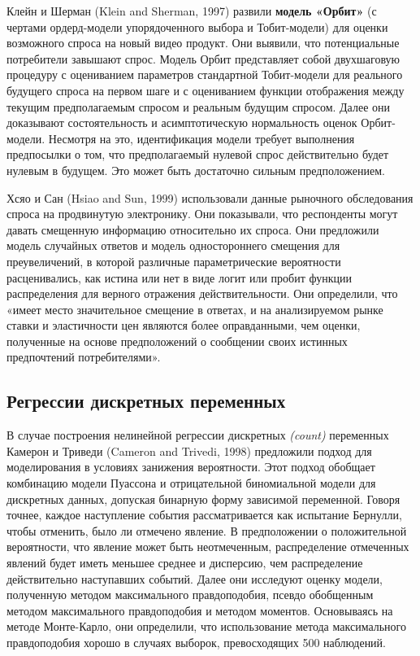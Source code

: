 Клейн и Шерман (Klein and Sherman, 1997) развили {\bf модель «Орбит»} (с чертами ордерд-модели упорядоченного выбора и Тобит-модели) для оценки возможного спроса на новый видео продукт. Они выявили, что потенциальные потребители завышают спрос. Модель Орбит представляет собой двухшаговую процедуру с оцениванием параметров стандартной Тобит-модели для реального будущего спроса на первом шаге и с оцениванием функции отображения между текущим предполагаемым спросом и реальным будущим спросом. Далее они доказывают состоятельность и асимптотическую нормальность оценок Орбит-модели. Несмотря на это, идентификация модели требует выполнения предпосылки о том, что предполагаемый нулевой спрос действительно будет нулевым в будущем. Это может быть достаточно сильным предположением.
 
Хсяо и Сан (Hsiao and Sun, 1999) использовали данные рыночного обследования спроса на продвинутую электронику. Они показывали, что респонденты могут давать смещенную информацию относительно их спроса. Они предложили модель случайных ответов и модель одностороннего смещения для преувеличений, в которой различные параметрические вероятности расценивались, как истина или нет в виде логит или пробит функции распределения для верного отражения действительности. Они определили, что «имеет место значительное смещение в ответах, и на анализируемом рынке ставки и эластичности цен являются более оправданными, чем оценки, полученные на основе  предположений о сообщении своих истинных предпочтений потребителями».

\subsection*{Регрессии дискретных переменных} 
В случае построения нелинейной регрессии дискретных \emph{(count)} переменных Камерон и Триведи (Cameron and Trivedi, 1998) предложили подход для моделирования в условиях занижения вероятности. Этот подход обобщает комбинацию модели Пуассона и отрицательной биномиальной модели для дискретных данных, допуская бинарную форму зависимой переменной.  Говоря точнее, каждое наступление события рассматривается как испытание Бернулли, чтобы отменить, было ли отмечено явление. В предположении о положительной вероятности, что явление может быть неотмеченным, распределение отмеченных явлений будет иметь меньшее среднее и дисперсию, чем распределение действительно наступавших событий. Далее они исследуют оценку модели, полученную методом максимального правдоподобия, псевдо обобщенным методом максимального правдоподобия и методом моментов. Основываясь на методе Монте-Карло, они определили, что использование метода максимального правдоподобия хорошо в случаях выборок, превосходящих 500 наблюдений.


